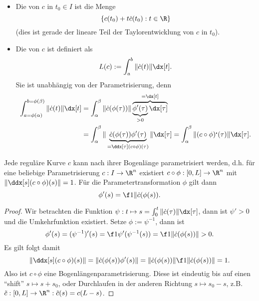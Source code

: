 \begin{df}
	\begin{itemize}
		\item
			Die  von $c$ in $t_0 \in I$ ist die Menge
			\[
				\{ c(t_0) + t \dot c(t_0) : t \in \R \}
			\]
			(dies ist gerade der lineare Teil der Taylorentwicklung von $c$ in $t_0$).
		\item
			Die  von $c$ ist definiert als
			\[
				L(c) := \int_a^b \|\dot c(t)\| \dx[t].
			\]
			Sie ist unabhängig von der Parametrisierung, denn
			\begin{align*}
				\int_{a=\phi(\alpha)}^{b=\phi(\beta)} \|\dot c(t)\| \dx[t]
				&= \int_{\alpha}^\beta \|\dot c(\phi(\tau)) \| \overbrace{\underbrace{\phi'(\tau)}_{>0} \dx[\tau]}^{= \dx[t]} \\
				&= \int_\alpha^\beta \|\underbrace{\dot c(\phi(\tau)) \phi'(\tau) }_{=\ddx[\tau] (c\circ \phi)(\tau)}\| \dx[\tau]
				= \int_\alpha^\beta \| (c \circ \phi)^\centerdot (\tau) \| \dx[\tau].
			\end{align*}
	\end{itemize}
\end{df}

\begin{lem} \label{lem:curve_natural_parametrization}
	Jede reguläre Kurve $c$ kann nach ihrer Bogenlänge parametrisiert werden, d.h. für eine beliebige Parametrisierung $c: I \to \R^n$ existiert $c\circ \phi: [0,L] \to \R^n$ mit $\|\ddx[s] (c \circ \phi)(s)\| = 1$.
	Für die Parametertransformation $\phi$ gilt dann
	\[
		\phi'(s) = \f 1{\|\dot c (\phi(s))}.
	\]
	\begin{proof}
		Wir betrachten die Funktion $\psi: t \mapsto s = \int_0^t \|\dot c(\tau)\| \dx[\tau]$, dann ist $\psi' > 0$ und die Umkehrfunktion existiert.
		Setze $\phi := \psi^{-1}$, dann ist
		\[
			\phi'(s)
			= (\psi^{-1})'(s)
			= \f 1{\psi'(\psi^{-1}(s))}
			= \f 1{\|\dot c(\phi(s))\|}
			> 0.
		\]
		Es gilt folgt damit
		\[
			\| \ddx[s] (c \circ \phi)(s) \|
			= \| \dot c (\phi(s)) \phi'(s) \|
			= \| \dot c (\phi(s)) \| \f 1{\|\dot c(\phi(s))\|}
			= 1.
		\]
		Also ist $c \circ \phi$ eine Bogenlängenparametrisierung.
		Diese ist eindeutig bis auf einen “shift” $s \mapsto s + s_0$,
		oder Durchlaufen in der anderen Richtung $s \mapsto s_0 - s$, z.B. $\tilde c: [0,L] \to \R^n : \tilde c(s) = c(L - s)$.
	\end{proof}
\end{lem}

